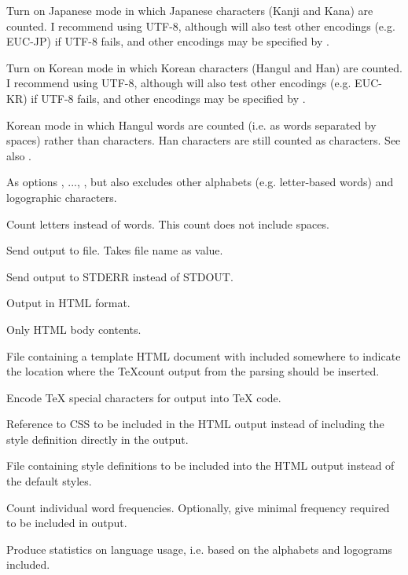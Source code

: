 \begin{description}
\option[-jp, -japanese]Turn on Japanese mode in which Japanese characters (Kanji and Kana) are counted. I recommend using UTF-8, although \TeXcount{} will also test other encodings (e.g. EUC-JP) if UTF-8 fails, and other encodings may be specified by .

\option[-kr, -korean]Turn on Korean mode in which Korean characters (Hangul and Han) are counted. I recommend using UTF-8, although \TeXcount{} will also test other encodings (e.g. EUC-KR) if UTF-8 fails, and other encodings may be specified by .

Korean mode in which Hangul words are counted (i.e. as words separated by spaces) rather than characters. Han characters are still counted as characters. See also .

As options , ..., , but also excludes other alphabets (e.g. letter-based words) and logographic characters.

Count letters instead of words. This count does not include spaces.

\option[-out=]Send output to file. Takes file name as value.

Send output to STDERR instead of STDOUT.

\option[-html]Output in HTML format.

\option[-htmlcore]Only HTML body contents.

\option[-htmlfile=]File containing a template HTML document with  included somewhere to indicate the location where the TeXcount output from the parsing should be inserted.

\option[-tex]Encode \TeX{} special characters for output into \TeX{} code.

\option[-css=]Reference to CSS to be included in the HTML output instead of including the style definition directly in the output.

\option[-cssfile=, -css=file:]File containing style definitions to be included into the HTML output instead of the default styles.

\option[-freq\alt{=\#}]Count individual word frequencies. Optionally, give minimal frequency required to be included in output.

\option[-stat]Produce statistics on language usage, i.e. based on the alphabets and logograms included.


\end{description}
